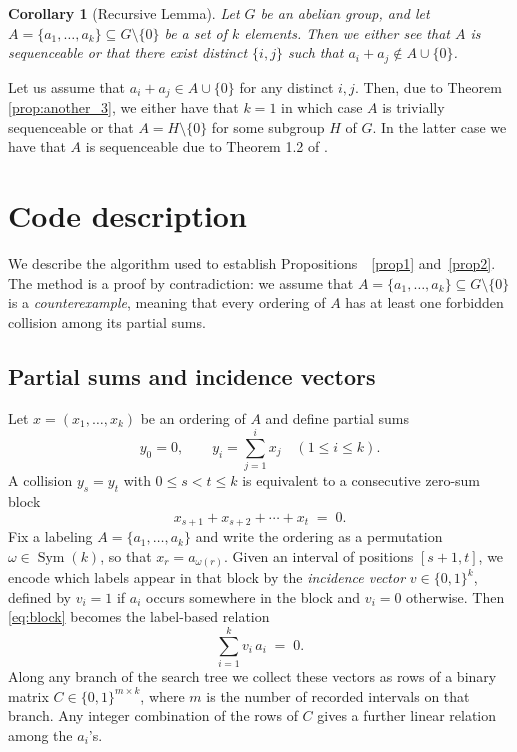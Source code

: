 \documentclass[11pt]{amsart}
\newtheorem{corollary}[theorem]{Corollary}
\theoremstyle{definition}
\DeclareMathOperator{\Sym}{Sym}
\begin{document}
\begin{corollary}[Recursive Lemma]\label{col:recursive_lemma}
Let $G$ be an abelian group, and let $A=\{a_1,\ldots,a_k\}\subseteq G\setminus \{0\}$ be a set of $k$ elements. Then we either see that $A$ is sequenceable or that there exist distinct $\{i,j\}$ such that $a_i+a_j\not \in A\cup \{0\}$.
\end{corollary}
\proof
Let us assume that $a_i+a_j \in A\cup \{0\}$ for any distinct $i,j$. Then, due to Theorem \ref{prop:another_3}, we either have that $k=1$ in which case $A$ is trivially sequenceable or that $A=H\setminus \{0\}$ for some subgroup $H$ of $G$. In the latter case we have that $A$ is sequenceable due to Theorem 1.2 of \cite{AKP}.
\endproof
\section{Code description}
We describe the algorithm used to establish Propositions~~\ref{prop1} and~\ref{prop2}.
The method is a proof by contradiction: we assume that
$A=\{a_1,\dots,a_k\}\subseteq G\setminus\{0\}$ is a \emph{counterexample},
meaning that every ordering of $A$ has at least one forbidden collision among
its partial sums.

\subsection*{Partial sums and incidence vectors}

Let $x=(x_1,\dots,x_k)$ be an ordering of $A$ and define partial sums
\[
y_0=0,\qquad y_i=\sum_{j=1}^i x_j \quad(1\le i\le k).
\]
A collision $y_s=y_t$ with $0\le s<t\le k$ is equivalent to a consecutive
zero-sum block
\begin{equation}\label{eq:block}
	x_{s+1}+x_{s+2}+\cdots+x_t \;=\; 0.
\end{equation}
Fix a labeling $A=\{a_1,\dots,a_k\}$ and write the ordering as a permutation
$\omega\in\Sym(k)$, so that $x_r=a_{\omega(r)}$.
Given an interval of positions $[s+1,t]$, we encode which labels appear in that
block by the \emph{incidence vector} $v\in\{0,1\}^k$, defined by $v_i=1$ if
$a_i$ occurs somewhere in the block and $v_i=0$ otherwise.  Then
\eqref{eq:block} becomes the label-based relation
\begin{equation}\label{eq:incidence_relation}
	\sum_{i=1}^k v_i\,a_i \;=\; 0.
\end{equation}
Along any branch of the search tree we collect these vectors as rows of a
binary matrix $C\in\{0,1\}^{m\times k}$, where $m$ is the number of recorded
intervals on that branch.  Any integer combination of the rows of $C$ gives a
further linear relation among the $a_i$'s.
\end{document}
